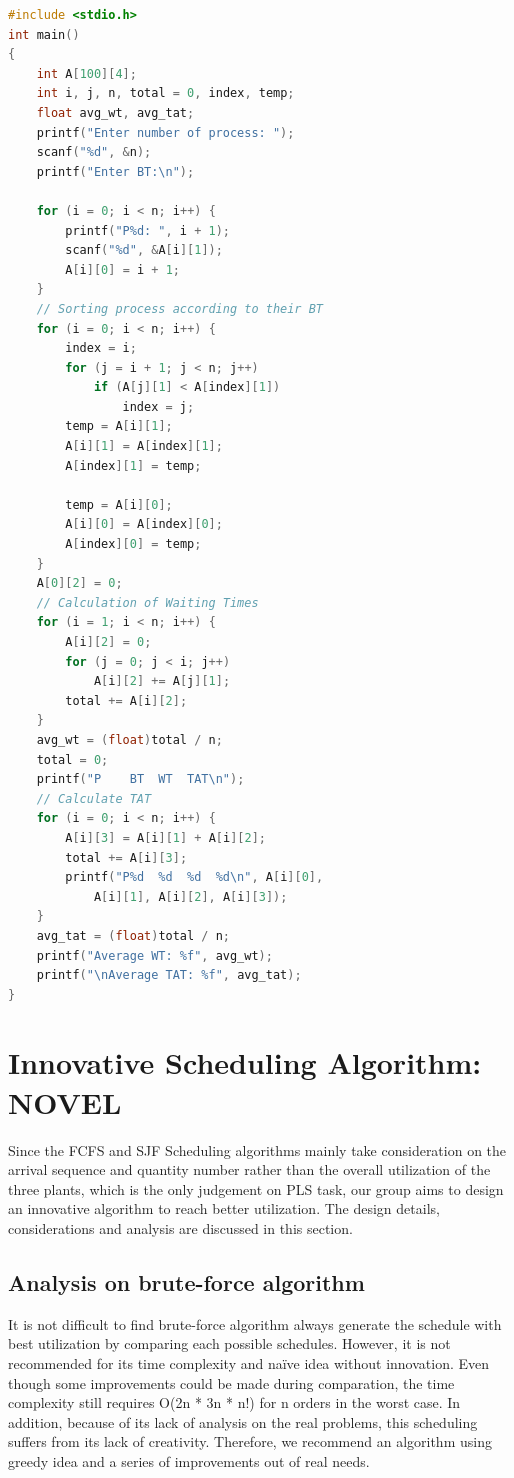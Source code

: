 \documentclass[conference]{IEEEtran}
\begin{document}
\begin{lstlisting}[language=C, caption=SJF Example]
#include <stdio.h>
int main()
{
	int A[100][4];
	int i, j, n, total = 0, index, temp;
	float avg_wt, avg_tat;
	printf("Enter number of process: ");
	scanf("%d", &n);
	printf("Enter BT:\n");
	
	for (i = 0; i < n; i++) {
		printf("P%d: ", i + 1);
		scanf("%d", &A[i][1]);
		A[i][0] = i + 1;
	}
	// Sorting process according to their BT
	for (i = 0; i < n; i++) {
		index = i;
		for (j = i + 1; j < n; j++)
			if (A[j][1] < A[index][1])
				index = j;
		temp = A[i][1];
		A[i][1] = A[index][1];
		A[index][1] = temp;

		temp = A[i][0];
		A[i][0] = A[index][0];
		A[index][0] = temp;
	}
	A[0][2] = 0;
	// Calculation of Waiting Times
	for (i = 1; i < n; i++) {
		A[i][2] = 0;
		for (j = 0; j < i; j++)
			A[i][2] += A[j][1];
		total += A[i][2];
	}
	avg_wt = (float)total / n;
	total = 0;
	printf("P	 BT	 WT	 TAT\n");
	// Calculate TAT
	for (i = 0; i < n; i++) {
		A[i][3] = A[i][1] + A[i][2];
		total += A[i][3];
		printf("P%d	 %d	 %d	 %d\n", A[i][0],
			A[i][1], A[i][2], A[i][3]);
	}
	avg_tat = (float)total / n;
	printf("Average WT: %f", avg_wt);
	printf("\nAverage TAT: %f", avg_tat);
}

\end{lstlisting}

\section{\textbf{Innovative Scheduling Algorithm: NOVEL}}
Since the FCFS and SJF Scheduling algorithms mainly take consideration on the arrival sequence and quantity number rather than the overall utilization of the three plants, which is the only judgement on PLS task, our group aims to design an innovative algorithm to reach better utilization. The design details, considerations and analysis are discussed in this section.
\subsection{Analysis on brute-force algorithm}
It is not difficult to find brute-force algorithm always generate the schedule with best utilization by comparing each possible schedules. However, it is not recommended for its time complexity and naïve idea without innovation. Even though some improvements could be made during comparation, the time complexity still requires O(2n * 3n * n!) for n orders in the worst case. In addition, because of its lack of analysis on the real problems, this scheduling suffers from its lack of creativity. Therefore, we recommend an algorithm using greedy idea and a series of improvements out of real needs.
\end{document}
